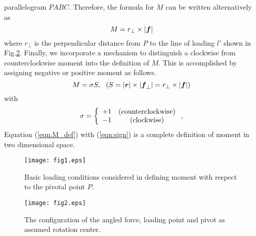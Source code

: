 \documentclass[10pt,a4j]{article}
\begin{document}
parallelogram $PABC$. Therefore, the formula for $M$ can be written alternatively as
\begin{equation}
	M=r_\perp \times |\mbox{\boldmath $f$}|
	\label{eqn:}
\end{equation}
where $r_\perp$ is the perpendicular distance from $P$ to the line of loading 
$l'$ shown in Fig.\ref{fig:fig2}.
Finally, we incorporate a mechanism to distinguish a clockwise from counterclockwise 
moment into the definition of $M$. This is accomplished by assigning negative or  
positive moment as follows.
\begin{equation}
	M=\sigma S , \ \ \left(S= |\mbox{\boldmath $r$}|\times |\mbox{\boldmath $f$}_{\perp}|=r_\perp \times |\mbox{\boldmath $f$}| \right)
	\label{eqn:M_def}
\end{equation}
with 
\begin{equation}
	\sigma=\left\{
		\begin{array}{cc}
			+1 & ({\rm counterclockwise}) \\
			-1 & ({\rm clockwise}) 
		\end{array}
	\right.
	,
	\label{eqn:sign}
\end{equation}
Equation (\ref{eqn:M_def}) with (\ref{eqn:sign}) is a complete definition of moment in two dimensional space. 
\begin{figure}[h]
	\begin{center}
	\texttt{[image: fig1.eps]} 
	\end{center}
	\caption{
		Basic loading conditions considered in defining moment with 
		respect to the pivotal point $P$.} 
	\label{fig:fig1}
\end{figure}
\begin{figure}[h]
	\begin{center}
	\texttt{[image: fig2.eps]} 
	\end{center}
	\caption{The configuration of the angled force, loading point and pivot as assumed rotation center.} 
	\label{fig:fig2}
\end{figure}
\end{document}

